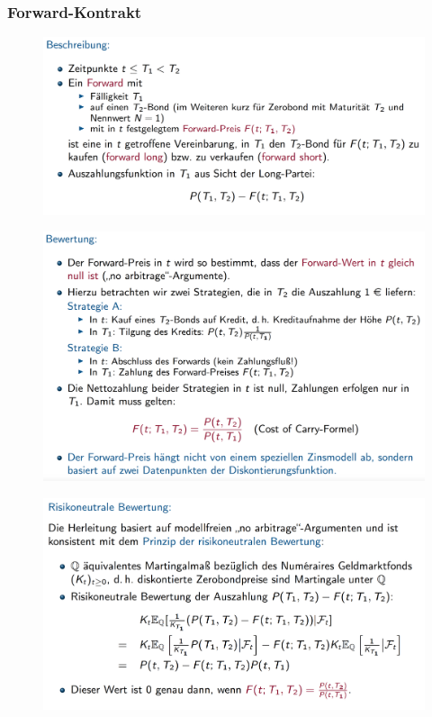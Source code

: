 \documentclass[12pt]{report}
\theoremstyle{dotless}
\theoremstyle{definition}
\begin{document}
\subsubsection{Forward-Kontrakt}

\begin{figure}[H]
\centering
\includegraphics[width=\textwidth]{Bilder/FwdKontrakt1.png}
\end{figure}

\begin{figure}[H]
\centering
\includegraphics[width=\textwidth]{Bilder/FwdKontrakt2.png}
\end{figure}

\begin{figure}[H]
\centering
\includegraphics[width=\textwidth]{Bilder/FwdKontrakt3.png}
\end{figure}
\end{document}
